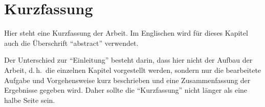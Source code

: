 \chapter*{Kurzfassung}

Hier steht eine Kurzfassung der Arbeit. Im Englischen wird für dieses Kapitel auch die Überschrift ``abstract'' verwendet.

Der Unterschied zur ``Einleitung'' besteht darin, dass hier nicht der Aufbau der Arbeit, d.\,h.\ die
einzelnen Kapitel vorgestellt werden, sondern nur die bearbeitete Aufgabe und
Vorgehensweise kurz beschrieben und eine Zusammenfassung der Ergebnisse gegeben wird. Daher sollte
die ``Kurzfassung'' nicht länger als eine halbe Seite sein.
